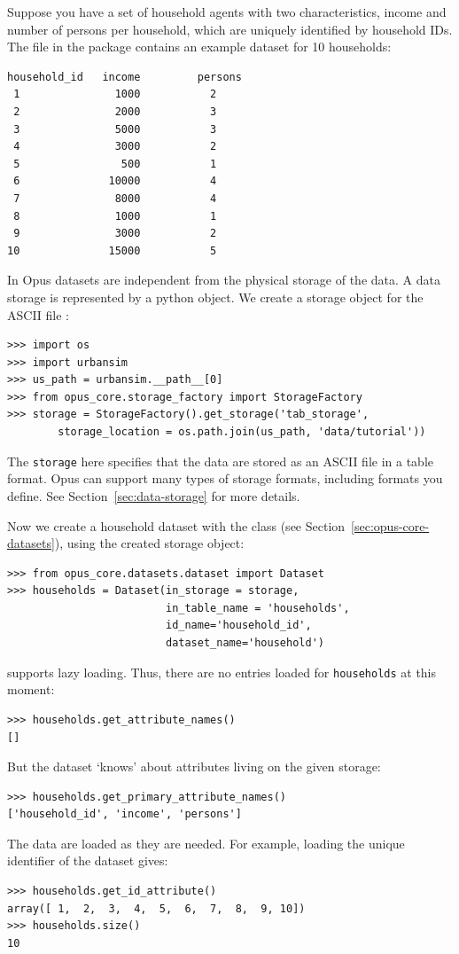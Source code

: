 Suppose you have a set of household agents  with two characteristics, \characteristicsindex income
and number of persons per household, which are uniquely identified by
household IDs. The file  in the 
package contains an example dataset \datasetindex for 10 households:
\begin{verbatim}
household_id   income         persons
 1               1000           2
 2               2000           3
 3               5000           3
 4               3000           2
 5                500           1
 6              10000           4
 7               8000           4
 8               1000           1
 9               3000           2
10              15000           5
\end{verbatim}

In Opus datasets are independent from the physical storage of the data. A data storage
is represented by a python object. We create a storage object for the ASCII file :

 \label{storagepage}
\begin{verbatim}
>>> import os
>>> import urbansim
>>> us_path = urbansim.__path__[0]
>>> from opus_core.storage_factory import StorageFactory
>>> storage = StorageFactory().get_storage('tab_storage',
        storage_location = os.path.join(us_path, 'data/tutorial'))
\end{verbatim}

The \verb|storage| here specifies that the data
are stored as an ASCII file in a table format. 
Opus can support many types of storage formats, including formats you define. See Section~\ref{sec:data-storage}
for more details.

Now we create a household dataset \datasetindex with the  class  
(see Section~\ref{sec:opus-core-datasets}), using the created
storage object:
\begin{verbatim}
>>> from opus_core.datasets.dataset import Dataset
>>> households = Dataset(in_storage = storage,
                         in_table_name = 'households', 
                         id_name='household_id',
                         dataset_name='household')
\end{verbatim}

 supports lazy loading. Thus, there are no entries
loaded for \verb|households| at this moment:
\begin{verbatim}
>>> households.get_attribute_names()
[]
\end{verbatim}
But the dataset \datasetindex `knows' about attributes \attributesindex living on the given storage:
\begin{verbatim}
>>> households.get_primary_attribute_names()
['household_id', 'income', 'persons']
\end{verbatim}
The data are loaded as they are needed. For example, loading the
unique identifier of the dataset \datasetindex gives:
\begin{verbatim}
>>> households.get_id_attribute()
array([ 1,  2,  3,  4,  5,  6,  7,  8,  9, 10])
>>> households.size()
10
\end{verbatim}

